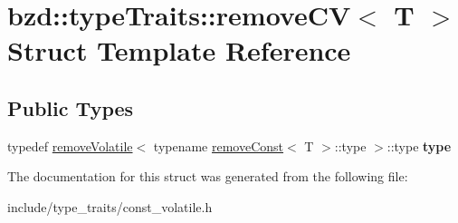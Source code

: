 \hypertarget{structbzd_1_1typeTraits_1_1removeCV}{}\section{bzd\+:\+:type\+Traits\+:\+:remove\+CV$<$ T $>$ Struct Template Reference}
\label{structbzd_1_1typeTraits_1_1removeCV}
\subsection*{Public Types}
\begin{DoxyCompactItemize}
\item 
\mbox{\label{structbzd_1_1typeTraits_1_1removeCV_a31dbfadc335e33a437aa05845a90b997}} 
typedef \hyperlink{structbzd_1_1typeTraits_1_1removeVolatile}{remove\+Volatile}$<$ typename \hyperlink{structbzd_1_1typeTraits_1_1removeConst}{remove\+Const}$<$ T $>$\+::type $>$\+::type {\bfseries type}
\end{DoxyCompactItemize}


The documentation for this struct was generated from the following file\+:\begin{DoxyCompactItemize}
\item 
include/type\+\_\+traits/const\+\_\+volatile.\+h\end{DoxyCompactItemize}
